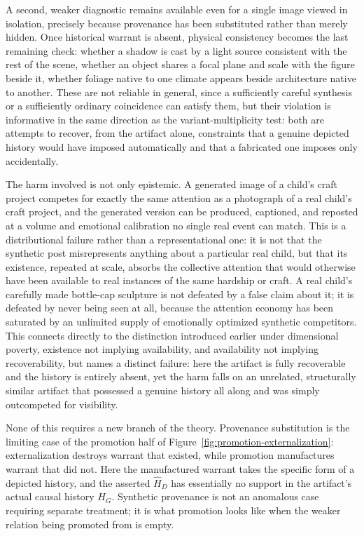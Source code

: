 \documentclass[11pt]{article}
\begin{document}
A second, weaker diagnostic remains available even for a single image viewed in isolation, precisely because provenance has been substituted rather than merely hidden. Once historical warrant is absent, physical consistency becomes the last remaining check: whether a shadow is cast by a light source consistent with the rest of the scene, whether an object shares a focal plane and scale with the figure beside it, whether foliage native to one climate appears beside architecture native to another. These are not reliable in general, since a sufficiently careful synthesis or a sufficiently ordinary coincidence can satisfy them, but their violation is informative in the same direction as the variant-multiplicity test: both are attempts to recover, from the artifact alone, constraints that a genuine depicted history would have imposed automatically and that a fabricated one imposes only accidentally.

The harm involved is not only epistemic. A generated image of a child's craft project competes for exactly the same attention as a photograph of a real child's craft project, and the generated version can be produced, captioned, and reposted at a volume and emotional calibration no single real event can match. This is a distributional failure rather than a representational one: it is not that the synthetic post misrepresents anything about a particular real child, but that its existence, repeated at scale, absorbs the collective attention that would otherwise have been available to real instances of the same hardship or craft. A real child's carefully made bottle-cap sculpture is not defeated by a false claim about it; it is defeated by never being seen at all, because the attention economy has been saturated by an unlimited supply of emotionally optimized synthetic competitors. This connects directly to the distinction introduced earlier under dimensional poverty, existence not implying availability, and availability not implying recoverability, but names a distinct failure: here the artifact is fully recoverable and the history is entirely absent, yet the harm falls on an unrelated, structurally similar artifact that possessed a genuine history all along and was simply outcompeted for visibility.

None of this requires a new branch of the theory. Provenance substitution is the limiting case of the promotion half of Figure~\ref{fig:promotion-externalization}: externalization destroys warrant that existed, while promotion manufactures warrant that did not. Here the manufactured warrant takes the specific form of a depicted history, and the asserted $\widehat H_D$ has essentially no support in the artifact's actual causal history $H_G$. Synthetic provenance is not an anomalous case requiring separate treatment; it is what promotion looks like when the weaker relation being promoted from is empty.
\end{document}
